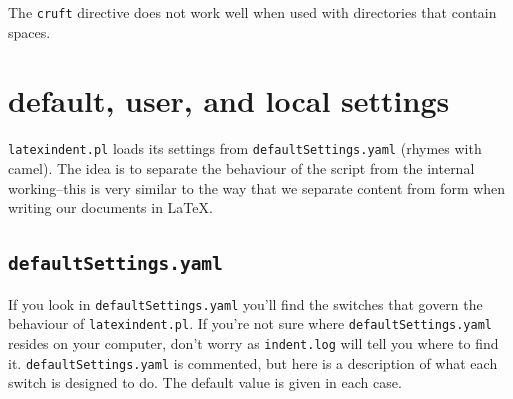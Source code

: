 \documentclass[11pt]{article}
\begin{document}
The \lstinline!cruft! directive does not work well when used with
directories that contain spaces.

\section{default, user, and local settings}\label{sec:defuseloc}
\lstinline!latexindent.pl! loads its settings from \lstinline!defaultSettings.yaml!
(rhymes with camel). The idea is to separate the behaviour of the script
from the internal working--this is very similar to the way that we separate content
from form when writing our documents in \LaTeX.

\subsection{\lstinline!defaultSettings.yaml!}
If you look in \lstinline!defaultSettings.yaml! you'll find the switches
that govern the behaviour of \lstinline!latexindent.pl!. If you're not sure where
\lstinline!defaultSettings.yaml! resides on your computer, don't worry as \lstinline!indent.log!
will tell you where to find it.
\lstinline!defaultSettings.yaml! is commented,
but here is a description of what each switch is designed to do. The default
value is given in each case.
\end{document}
